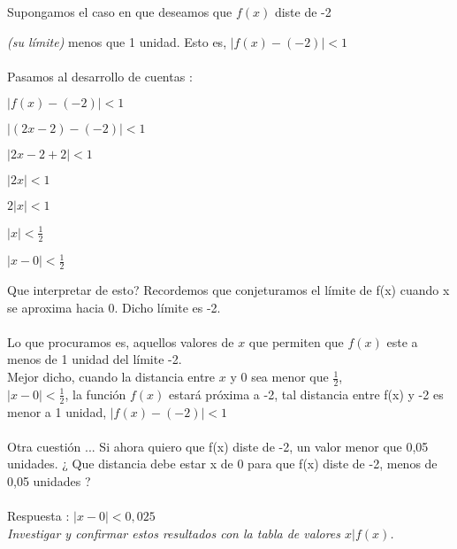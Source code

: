 \documentclass[11pt, a4paper]{article}
\begin{document}
Supongamos el caso en que deseamos que $f(x)$ diste de -2 {\textit{(su l\'imite)} menos que 1 unidad. Esto es, {\color{blue} $ | f(x) - (-2) | < 1 $} \\ \\ 
Pasamos al desarrollo de cuentas : 
\begin{center}
    $ | f(x) - (-2) | < 1$ \\ \hfill
    
    $ | (2x - 2) - (-2) | < 1$\\ \hfill

    $ | 2x - 2 + 2 | < 1$ \\ \hfill

    $ | 2x | < 1$ \\ \hfill

    $ 2| x | < 1$ \\ \hfill

    $ | x | <  \frac{1}{2} $ \\ \hfill

   {\color{green} $ | x - 0 | <  \frac{1}{2} $ }\\ \hfill

    
\end{center}

Que interpretar de esto? Recordemos que conjeturamos el l\'imite de f(x) cuando x se aproxima hacia 0. Dicho l\'imite es -2. \\ \\ Lo que procuramos es, aquellos valores de $x$ que permiten que $f(x)$ este a menos de 1 unidad del l\'imite -2.\\

Mejor dicho, cuando la distancia entre $x$ y $0$ sea menor que $\frac{1}{2}$, \\
{\color{blue} $| x - 0 | < \frac{1}{2} $}, la funci\'on $f(x)$ estar\'a pr\'oxima a -2, tal distancia entre f(x) y -2 es menor a 1 unidad, {\color{blue}$| f(x) - (-2) | < 1 $} \\ \\ 

Otra cuesti\'on ... Si ahora quiero que f(x) diste de -2, un valor menor que 0,05 unidades. {\color{magenta}¿ Que distancia debe estar x de 0 para que f(x) diste de -2, menos de 0,05 unidades ?  
} \\ \\
Respuesta : $| x - 0 | < 0,025$ \\

\textit{{\color{magenta} Investigar y confirmar estos resultados con la tabla de valores $x|f(x)$. }}
 
}
\end{document}

